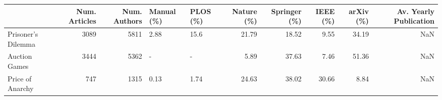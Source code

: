\begin{tabular}{lrrllrrrrr}
\toprule
{} &  Num. Articles &  Num. Authors & Manual (\%) & PLOS (\%) &  Nature (\%) &  Springer (\%) &  IEEE (\%) &  arXiv (\%) &  Av. Yearly Publication \\
\midrule
Prisoner's Dilemma &           3089 &          5811 &       2.88 &     15.6 &       21.79 &         18.52 &      9.55 &      34.19 &                     NaN \\
Auction Games      &           3444 &          5362 &          - &        - &        5.89 &         37.63 &      7.46 &      51.36 &                     NaN \\
Price of Anarchy   &            747 &          1315 &       0.13 &     1.74 &       24.63 &         38.02 &     30.66 &       8.84 &                     NaN \\
\bottomrule
\end{tabular}
